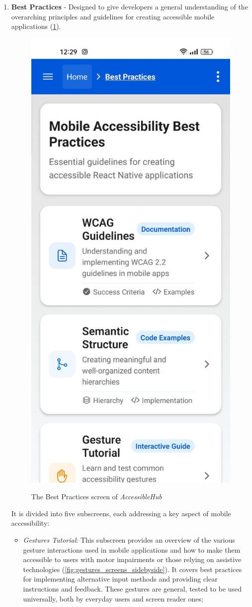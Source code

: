 \begin{enumerate}
\begin{itemize}
    \FloatBarrier
        
    \end{itemize}

\item \textbf{Best Practices} - Designed to give developers a general understanding of the overarching principles and guidelines for creating accessible mobile applications (\ref{fig:best-practices}).

\begin{figure}[ht]
\centering
\includegraphics[width=0.4\linewidth, alt={Screenshot of the Best Practices screen of AccessibleHub}]{img/best-practices.jpg}
\caption{The Best Practices screen of \textit{AccessibleHub}}\label{fig:best-practices}
\end{figure}

\pagebreak

It is divided into five subscreens, each addressing a key aspect of mobile accessibility:

    \begin{itemize}
        \item \textit{Gestures Tutorial}: This subscreen provides an overview of the various gesture interactions used in mobile applications and how to make them accessible to users with motor impairments or those relying on assistive technologies (\ref{fig:gestures_screens_sidebyside}). It covers best practices for implementing alternative input methods and providing clear instructions and feedback. These gestures are general, tested to be used universally, both by everyday users and screen reader ones;


\end{itemize}
\end{enumerate}
